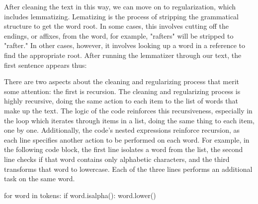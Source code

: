 \documentclass[11pt]{article}
\begin{document}
\begin{SOURCE}
\end{SOURCE}

After cleaning the text in this way, we can move on to regularization,
which includes lemmatizing. Lematizing is the process of stripping the
grammatical structure to get the word root. In some cases, this
involves cutting off the endings, or affixes, from the word, for
example, "rafters" will be stripped to "rafter." In other cases,
however, it involves looking up a word in a reference to find the
appropriate root. After running the lemmatizer through our text, the
first sentence appears thus:

\begin{SOURCE}
\end{SOURCE}

There are two aspects about the cleaning and regularizing process that
merit some attention: the first is recursion. The cleaning and
regularizing process is highly recursive, doing the same action to
each item to the list of words that make up the text. The logic of the
code reinforces this recursiveness, especially in the loop which
iterates through items in a list, doing the same thing to each item,
one by one. Additionally, the code's nested expressions reinforce
recursion, as each line specifies another action to be performed on
each word. For example, in the following code block, the first line
isolates a word from the list, the second line checks if that word
contains only alphabetic characters, and the third transforms that
word to lowercase. Each of the three lines performs an additional task
on the same word.

\begin{SOURCE}
for word in tokens:
    if word.isalpha():
        word.lower()
\end{SOURCE}
\end{document}
